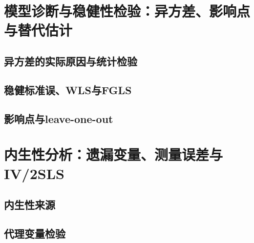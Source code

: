 \documentclass[UTF8,zihao=-4]{ctexart}
\begin{document}
\section{模型诊断与稳健性检验：异方差、影响点与替代估计}

\subsection{异方差的实际原因与统计检验}


\subsection{稳健标准误、WLS与FGLS}


\subsection{影响点与leave-one-out}


\section{内生性分析：遗漏变量、测量误差与IV/2SLS}

\subsection{内生性来源}


\subsection{代理变量检验}
\end{document}
